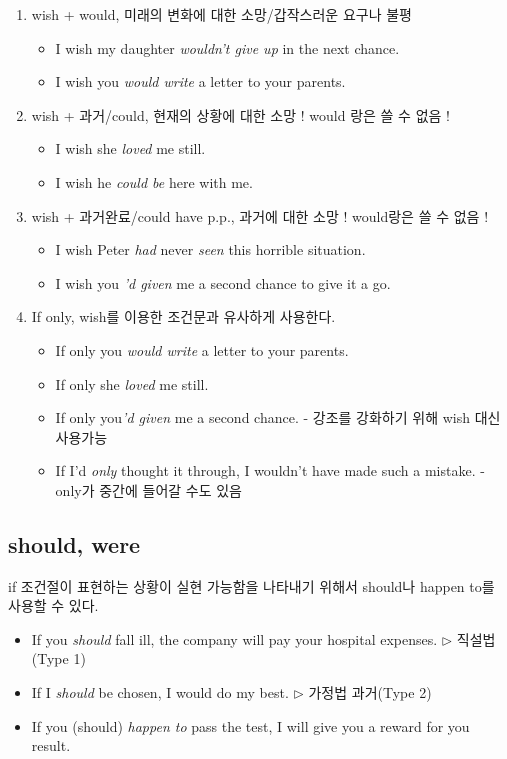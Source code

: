 \documentclass[ a4paper]{oblivoir}
\begin{document}
    \begin{enumerate}
        \item wish + would, 미래의 변화에 대한 소망/갑작스러운 요구나 불평
        \begin{itemize}[label = {--}]
            \item I wish my daughter \emph{wouldn't give up} in the next chance.
            \item I wish you \emph{would write} a letter to your parents.
        \end{itemize}
        \item wish + 과거/could, 현재의 상황에 대한 소망 ! would 랑은 쓸 수 없음 !
        \begin{itemize}[label = {--}]
            \item I wish she \emph{loved} me still.
            \item I wish he \emph{could be} here with me.
        \end{itemize}
        \item wish + 과거완료/could have p.p., 과거에 대한 소망 ! would랑은 쓸 수 없음 ! 
        \begin{itemize}[label = {--}]
            \item I wish Peter \emph{had} never \emph{seen} this horrible situation. 
            \item I wish you \emph{'d given} me a second chance to give it a go.
        \end{itemize}
        \item If only, wish를 이용한 조건문과 유사하게 사용한다. 
        \begin{itemize}[label = {--}]
            \item If only you \emph{would write} a letter to your parents. 
            \item If only she \emph{loved} me still.
            \item If only you\emph{'d given} me a second chance. - 강조를 강화하기 위해 wish 대신 사용가능
            \item If I'd \emph{only} thought it through, I wouldn't have made such a mistake. - only가 중간에 들어갈 수도 있음 
        \end{itemize}
    \end{enumerate}
    \subsection{should, were}

    if 조건절이 표현하는 상황이 실현 가능함을 나타내기 위해서 should나 happen to를 사용할 수 있다.
    \begin{itemize}[label = {--}]
        \item If you \emph{should} fall ill, the company will pay your hospital expenses. $\triangleright$ 직설법(Type 1)
        \item If I \emph{should} be chosen, I would do my best. $\triangleright$ 가정법 과거(Type 2)
        \item If you (should) \emph{happen to} pass the test, I will give you a reward for you result.  
    \end{itemize}  
\end{document}
